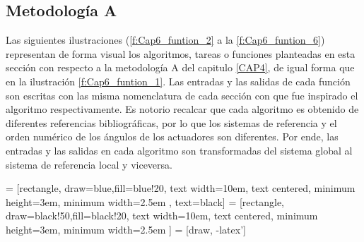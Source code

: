     \newpage


    \subsection{Metodología A}
    
    Las siguientes ilustraciones (\ref{f:Cap6_funtion_2} a la \ref{f:Cap6_funtion_6}) representan de forma visual los algoritmos, tareas o funciones planteadas en esta sección con respecto a la  metodología A del capitulo \ref{CAP4}, de igual forma que en la ilustración \ref{f:Cap6_funtion_1}. Las entradas y las salidas de cada función son escritas con las misma nomenclatura de cada sección con que fue inspirado el algoritmo respectivamente. Es notorio recalcar que cada algoritmo es obtenido de diferentes referencias bibliográficas, por lo que los sistemas de referencia y el orden numérico de los ángulos de los actuadores son diferentes. Por ende, las entradas y las salidas en cada algoritmo son transformadas del sistema global al sistema de referencia local y viceversa.     
    

            \hspace{1cm}


     = [rectangle, draw=blue,fill=blue!20, text width=10em, text centered, minimum height=3em, minimum width=2.5em , text=black]
     = [rectangle, draw=black!50,fill=black!20, text width=10em, text centered, minimum height=3em, minimum width=2.5em ]
     = [draw, -latex']


